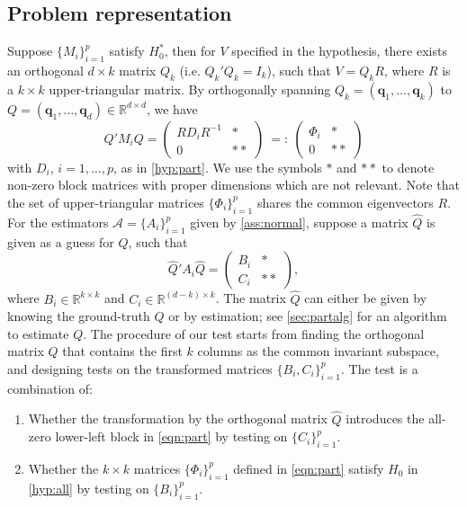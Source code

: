 \documentclass[12pt]{article}
\numberwithin{thm}{section}
\numberwithin{defn}{section}
\numberwithin{lem}{section}
\numberwithin{prop}{section}
\numberwithin{cor}{section}
\numberwithin{rem}{section}
\begin{document}
\subsection{Problem representation} \label{sec:partialprob}
\vspace{-0.3cm}
Suppose $\{M_i\}_{i = 1}^p$ satisfy $H_0^{*}$, then for $V$ specified in the hypothesis, there exists an orthogonal $d \times k$ matrix $Q_k$ (i.e. $Q_k' Q_k = I_k$), such that $V = Q_k R$, where $R$ is a $k \times k$ upper-triangular matrix. By orthogonally spanning $Q_k = (\bm{q}_1, \dots, \bm{q}_k)$ to $Q = (\bm{q}_1, \dots, \bm{q}_d) \in \mathbb{R}^{d \times d}$, we have
\begin{equation}
   Q' M_i Q = \begin{pmatrix} R D_i R^{-1} & * \\ 0 & ** \end{pmatrix} ~ =: ~ \begin{pmatrix} \Phi_i & * \\ 0 & ** \end{pmatrix}\label{eqn:part}
\end{equation}
with $D_{i}$, $i=1,\dots,p$, as in \eqref{hyp:part}.
We use the symbols $*$ and $**$ to denote non-zero block matrices with proper dimensions which are not relevant. Note that the set of upper-triangular matrices $\{\Phi_i\}_{i = 1}^p$ shares the common eigenvectors $R$. For the estimators $\mathcal{A} = \{A_i\}_{i = 1}^p$ given by \autoref{ass:normal}, suppose a matrix $\widehat{Q}$ is given as a guess for $Q$, such that
\begin{equation}
    \widehat{Q}' A_i \widehat{Q} = \begin{pmatrix} B_i & * \\ C_i & ** \end{pmatrix},\label{eqn:part_noisy}
\end{equation}
where $B_i \in \mathbb{R}^{k \times k}$ and $C_i \in \mathbb{R}^{(d-k) \times k}$. 
The matrix $\widehat{Q}$ can either be given by knowing the ground-truth $Q$ or by estimation; see \autoref{sec:partalg} for an algorithm to estimate $Q$.
The procedure of our test starts from finding the orthogonal matrix $Q$ that contains the first $k$ columns as the common invariant subspace, and designing tests on the transformed matrices $\{B_i, C_i\}_{i = 1}^p$. The test is a combination of:
\begin{enumerate}
    \item Whether the transformation by the orthogonal matrix $\widehat{Q}$ introduces the all-zero lower-left block in \eqref{eqn:part} by testing on $\{C_i\}_{i = 1}^p$.
    
    \item Whether the $k \times k$ matrices $\{\Phi_i\}_{i = 1}^p$ defined in \eqref{eqn:part} satisfy $H_0$ in \eqref{hyp:all} by testing on $\{B_i\}_{i = 1}^p$.
\end{enumerate}
\end{document}
